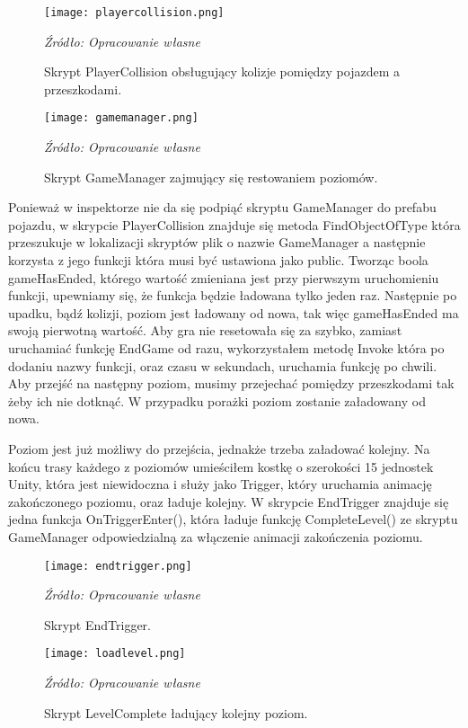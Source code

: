 \begin{figure}[!hbt]
\centering
  \texttt{[image: playercollision.png]}
  \caption{Skrypt PlayerCollision obsługujący kolizje pomiędzy pojazdem a przeszkodami.}\label{rys_5}
  \begin{minipage}[t]{0.75\linewidth}
    \emph{Źródło: Opracowanie własne}
  \end{minipage}
\end{figure}
\begin{figure}[!ht]
\centering
  \texttt{[image: gamemanager.png]}
  \caption{Skrypt GameManager zajmujący się restowaniem poziomów.}\label{rys_6}
  \begin{minipage}[t]{0.75\linewidth}
    \emph{Źródło: Opracowanie własne}
  \end{minipage}
\end{figure}

\indent Ponieważ w inspektorze nie da się podpiąć skryptu GameManager do prefabu pojazdu, w skrypcie PlayerCollision znajduje się metoda FindObjectOfType która przeszukuje w lokalizacji skryptów plik o nazwie GameManager a następnie korzysta z jego funkcji która musi być ustawiona jako public. Tworząc boola gameHasEnded, którego wartość zmieniana jest przy pierwszym uruchomieniu funkcji, upewniamy się, że funkcja będzie ładowana tylko jeden raz. Następnie po upadku, bądź kolizji, poziom jest ładowany od nowa, tak więc gameHasEnded ma swoją pierwotną wartość. Aby gra nie resetowała się za szybko, zamiast uruchamiać funkcję EndGame od razu, wykorzystałem metodę Invoke która po dodaniu nazwy funkcji, oraz czasu w sekundach, uruchamia funkcję po chwili. Aby przejść na następny poziom, musimy przejechać pomiędzy przeszkodami tak żeby ich nie dotknąć. W przypadku porażki poziom zostanie załadowany od nowa.

\indent Poziom jest już możliwy do przejścia, jednakże trzeba załadować kolejny. Na końcu trasy każdego z poziomów umieściłem kostkę o szerokości 15 jednostek Unity, która jest niewidoczna i służy jako Trigger, który uruchamia animację zakończonego poziomu, oraz ładuje kolejny. W skrypcie EndTrigger znajduje się jedna funkcja OnTriggerEnter(), która ładuje funkcję CompleteLevel() ze skryptu GameManager odpowiedzialną za włączenie animacji zakończenia poziomu.

\begin{figure}[!ht]
\centering
  \texttt{[image: endtrigger.png]}
  \caption{Skrypt EndTrigger.}\label{rys_7}
  \begin{minipage}[t]{0.75\linewidth}
    \emph{Źródło: Opracowanie własne}
  \end{minipage}
\end{figure}

\begin{figure}[!ht]
\centering
  \texttt{[image: loadlevel.png]}
  \caption{Skrypt LevelComplete ładujący kolejny poziom.}\label{rys_8}
  \begin{minipage}[t]{0.75\linewidth}
    \emph{Źródło: Opracowanie własne}
  \end{minipage}
\end{figure}

